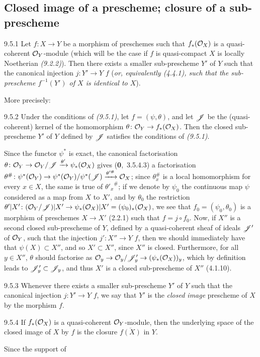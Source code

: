 \documentclass[../main.tex]{subfiles}
\begin{document}
\subsection{Closed image of a prescheme; closure of a sub-prescheme}

\begin{cx}[Proposition]{9.5.1}
    Let $f\colon X\to Y$ be a morphism of preschemes such that $f_*(\mathcal{O}_X)$ is a quasi-coherent $\mathcal{O}_Y$-module (which will be the case if $f$ is quasi-compact  $X$ is locally Noetherian \emph{(9.2.2)}).
    Then there exists a smaller sub-prescheme $Y'$ of $Y$ such that the canonical injection $j\colon Y'\to Y$  $f$ (\emph{or, equivalently (4.4.1), such that the sub-prescheme $f^{-1}(Y')$ of $X$ is \emph{identical} to $X$}).
\end{cx}

More precisely:

\begin{cx}[Corollary]{9.5.2}
    Under the conditions of \emph{(9.5.1)}, let $f=(\psi,\theta)$, and let $\mathscr{J}$ be the (quasi-coherent) kernel of the homomorphism $\theta\colon\mathcal{O}_Y\to f_*(\mathcal{O}_X)$.
    Then the closed sub-prescheme $Y'$ of $Y$ defined by $\mathscr{J}$ satisfies the conditions of \emph{(9.5.1)}.
\end{cx}

Since the functor $\psi^*$ is exact, the canonical factorisation $\theta\colon\mathcal{O}_Y\to\mathcal{O}_Y/\mathscr{J}\xrightarrow{\theta'}\psi_*(\mathcal{O}_X)$ gives (\textbf{0},~3.5.4.3) a factorisation $\theta^\#\colon\psi^*(\mathcal{O}_Y)\to\psi^*(\mathcal{O}_Y)/\psi^*(\mathscr{J})\xrightarrow{\theta'^\#}\mathcal{O}_X$; since $\theta_x^\#$ is a local homomorphism for every $x\in X$, the same is true of ${\theta'_x}^\#$; if we denote by $\psi_0$ the continuous map $\psi$ considered as a map from $X$ to $X'$, and by $\theta_0$ the restriction $\theta'|X'\colon(\mathcal{O}_Y/\mathscr{J})|X'\to\psi_*(\mathcal{O}_X)|X'=(\psi_0)_*(\mathcal{O}_X)$, we see that $f_0=(\psi_0,\theta_0)$ is a morphism of preschemes $X\to X'$ (2.2.1) such that $f=j\circ f_0$.
Now, if $X''$ is a second closed sub-prescheme of $Y$, defined by a quasi-coherent sheaf of ideals $\mathscr{J}'$ of $\mathcal{O}_Y$, such that the injection $j'\colon X''\to Y$  $f$, then we should immediately have that $\psi(X)\subset X''$, and so $X'\subset X''$, since $X''$ is closed.
Furthermore, for all $y\in X''$, $\theta$ should factorise as $\mathcal{O}_y\to\mathcal{O}_y/\mathscr{J}'_y\to(\psi_*(\mathcal{O}_X))_y$, which by definition leads to $\mathscr{J}'_y\subset\mathscr{J}_y$, and thus $X'$ is a closed sub-prescheme of $X''$ (4.1.10).

\begin{cx}[Definition]{9.5.3}
    Whenever there exists a smaller sub-prescheme $Y'$ of $Y$ such that the canonical injection $j\colon Y'\to Y$  $f$, we say that $Y'$ is the \emph{closed image} prescheme of $X$ by the morphism $f$.
\end{cx}

\begin{cx}[Proposition]{9.5.4}
    If $f_*(\mathcal{O}_X)$ is a quasi-coherent $\mathcal{O}_Y$-module, then the underlying space of the closed image of $X$ by $f$ is the closure $\overline{f(X)}$ in $Y$.
\end{cx}

Since the support of
\end{document}
